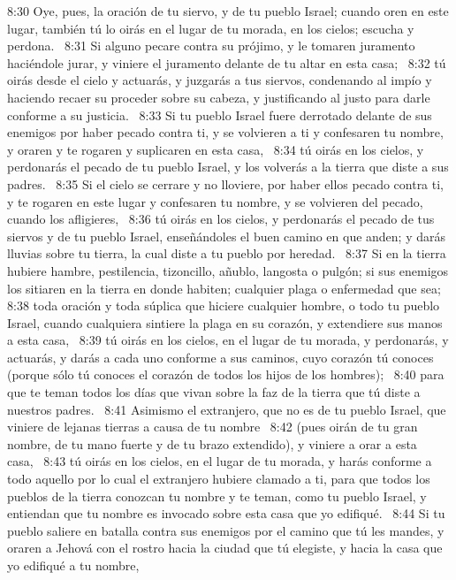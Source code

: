 8:30 Oye, pues, la oración de tu siervo, y de tu pueblo Israel; cuando oren en este lugar, también tú lo oirás en el lugar de tu morada, en los cielos; escucha y perdona.  
8:31 Si alguno pecare contra su prójimo, y le tomaren juramento haciéndole jurar, y viniere el juramento delante de tu altar en esta casa;  
8:32 tú oirás desde el cielo y actuarás, y juzgarás a tus siervos, condenando al impío y haciendo recaer su proceder sobre su cabeza, y justificando al justo para darle conforme a su justicia.  
8:33 Si tu pueblo Israel fuere derrotado delante de sus enemigos por haber pecado contra ti, y se volvieren a ti y confesaren tu nombre, y oraren y te rogaren y suplicaren en esta casa,  
8:34 tú oirás en los cielos, y perdonarás el pecado de tu pueblo Israel, y los volverás a la tierra que diste a sus padres.  
8:35 Si el cielo se cerrare y no lloviere, por haber ellos pecado contra ti, y te rogaren en este lugar y confesaren tu nombre, y se volvieren del pecado, cuando los afligieres,  
8:36 tú oirás en los cielos, y perdonarás el pecado de tus siervos y de tu pueblo Israel, enseñándoles el buen camino en que anden; y darás lluvias sobre tu tierra, la cual diste a tu pueblo por heredad.  
8:37 Si en la tierra hubiere hambre, pestilencia, tizoncillo, añublo, langosta o pulgón; si sus enemigos los sitiaren en la tierra en donde habiten; cualquier plaga o enfermedad que sea;  
8:38 toda oración y toda súplica que hiciere cualquier hombre, o todo tu pueblo Israel, cuando cualquiera sintiere la plaga en su corazón, y extendiere sus manos a esta casa,  
8:39 tú oirás en los cielos, en el lugar de tu morada, y perdonarás, y actuarás, y darás a cada uno conforme a sus caminos, cuyo corazón tú conoces (porque sólo tú conoces el corazón de todos los hijos de los hombres);  
8:40 para que te teman todos los días que vivan sobre la faz de la tierra que tú diste a nuestros padres.  
8:41 Asimismo el extranjero, que no es de tu pueblo Israel, que viniere de lejanas tierras a causa de tu nombre  
8:42 (pues oirán de tu gran nombre, de tu mano fuerte y de tu brazo extendido), y viniere a orar a esta casa,  
8:43 tú oirás en los cielos, en el lugar de tu morada, y harás conforme a todo aquello por lo cual el extranjero hubiere clamado a ti, para que todos los pueblos de la tierra conozcan tu nombre y te teman, como tu pueblo Israel, y entiendan que tu nombre es invocado sobre esta casa que yo edifiqué.  
8:44 Si tu pueblo saliere en batalla contra sus enemigos por el camino que tú les mandes, y oraren a Jehová con el rostro hacia la ciudad que tú elegiste, y hacia la casa que yo edifiqué a tu nombre,  
